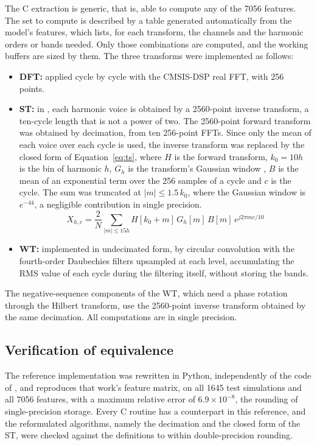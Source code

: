 \documentclass[11pt,a4paper]{article}
\begin{document}
The C extraction is generic, that is, able to compute any of the 7056 features. The set to compute is described by a table generated automatically from the model's features, which lists, for each transform, the channels and the harmonic orders or bands needed. Only those combinations are computed, and the working buffers are sized by them. The three transforms were implemented as follows:
\begin{itemize}
    \item \textbf{DFT:} applied cycle by cycle with the CMSIS-DSP real FFT, with 256 points.
    \item \textbf{ST:} in \citet{martins_tcc_en}, each harmonic voice is obtained by a 2560-point inverse transform, a ten-cycle length that is not a power of two. The 2560-point forward transform was obtained by decimation, from ten 256-point FFTs. Since only the mean of each voice over each cycle is used, the inverse transform was replaced by the closed form of Equation~\eqref{eq:ts}, where $H$ is the forward transform, $k_0 = 10h$ is the bin of harmonic $h$, $G_h$ is the transform's Gaussian window \citep{[54]}, $B$ is the mean of an exponential term over the 256 samples of a cycle and $c$ is the cycle. The sum was truncated at $|m| \leq 1.5\,k_0$, where the Gaussian window is $e^{-44}$, a negligible contribution in single precision.
    \begin{equation}
        X_{h,c} = \frac{2}{N} \sum_{|m| \leq 15h} H[k_0 + m]\, G_h[m]\, B[m]\, e^{j 2\pi m c / 10}
        \label{eq:ts}
    \end{equation}
    \item \textbf{WT:} implemented in undecimated form, by circular convolution with the fourth-order Daubechies filters upsampled at each level, accumulating the RMS value of each cycle during the filtering itself, without storing the bands.
\end{itemize}

The negative-sequence components of the WT, which need a phase rotation through the Hilbert transform, use the 2560-point inverse transform obtained by the same decimation. All computations are in single precision.

\subsection{Verification of equivalence}
\label{sec:verification}
The reference implementation was rewritten in Python, independently of the code of \citet{martins_tcc_en}, and reproduces that work's feature matrix, on all 1645 test simulations and all 7056 features, with a maximum relative error of $6.9 \times 10^{-8}$, the rounding of single-precision storage. Every C routine has a counterpart in this reference, and the reformulated algorithms, namely the decimation and the closed form of the ST, were checked against the definitions to within double-precision rounding.
\end{document}

